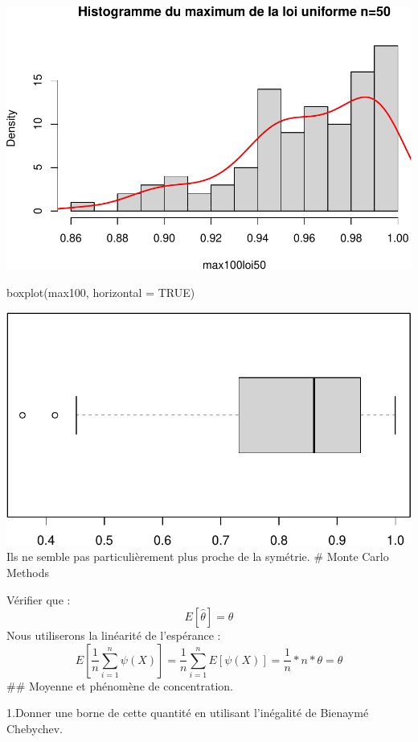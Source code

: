 \documentclass[
]{article}
\newenvironment{Shaded}{\begin{snugshade}}{\end{snugshade}}
\newcommand{\AttributeTok}[1]{\textcolor[rgb]{0.77,0.63,0.00}{#1}}
\newcommand{\ConstantTok}[1]{\textcolor[rgb]{0.00,0.00,0.00}{#1}}
\newcommand{\FunctionTok}[1]{\textcolor[rgb]{0.00,0.00,0.00}{#1}}
\newcommand{\NormalTok}[1]{#1}
\begin{document}
\includegraphics{tp2_files/figure-latex/unnamed-chunk-6-1.pdf}

\begin{Shaded}
\begin{Highlighting}[]
\FunctionTok{boxplot}\NormalTok{(max100, }\AttributeTok{horizontal =} \ConstantTok{TRUE}\NormalTok{)}
\end{Highlighting}
\end{Shaded}

\includegraphics{tp2_files/figure-latex/unnamed-chunk-6-2.pdf} Ils ne
semble pas particulièrement plus proche de la symétrie. \# Monte Carlo
Methods

Vérifier que : \[
E[\hat{\theta}] = \theta
\] Nous utiliserons la linéarité de l'espérance : \[
E[\frac{1}{n} \sum_{i=1}^{n} \psi(X)] = \frac{1}{n} \sum_{i=1}^n E[\psi(X)] = \frac{1}{n}*n*\theta=\theta
\] \#\# Moyenne et phénomène de concentration.

1.Donner une borne de cette quantité en utilisant l'inégalité de
Bienaymé Chebychev.
\end{document}
